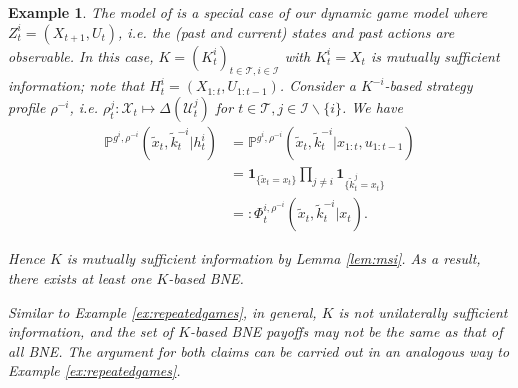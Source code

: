 \documentclass[pdflatex,sn-basic]{sn-jnl}
\renewcommand{\Pr}{\mathbb{P}}
\newcommand{\Comp}{K}
\newcommand{\comp}{k}
\theoremstyle{thmstyleone}%
\theoremstyle{thmstyletwo}%
\theoremstyle{thmstylethree}%
\newtheorem{example}{Example}
\begin{document}
\begin{example}\label{ex:maskintirole}
	The model of \citep{maskin2001markov} is a special case of our dynamic game model where $Z_t^i=(X_{t+1}, U_t)$, i.e. the (past and current) states and past actions are observable. In this case, $\Comp=(\Comp_t^i)_{t\in\mathcal{T}, i\in\mathcal{I}}$ with $\Comp_t^i=X_t$ is mutually sufficient information; note that $H_t^i=(X_{1:t}, U_{1:t-1})$. Consider a $\Comp^{-i}$-based strategy profile $\rho^{-i}$, i.e. $\rho_t^j\colon\mathcal{X}_t\mapsto \Delta(\mathcal{U}_t^j)$ for $t\in\mathcal{T}, j\in\mathcal{I}\backslash\{i\}$. We have
	\begin{align}
		\Pr^{g^i, \rho^{-i}}(\tilde{x}_t, \tilde{\comp}_t^{-i}|h_t^i) &=\Pr^{g^i, \rho^{-i}}(\tilde{x}_t, \tilde{\comp}_t^{-i}|x_{1:t}, u_{1:t-1})\\
		&= \bm{1}_{\{\tilde{x}_t = x_t\} } \prod_{j\neq i} \bm{1}_{\{\tilde{\comp}_t^j = x_t\} }\\
		&=:\Phi_t^{i, \rho^{-i}}(\tilde{x}_t, \tilde{\comp}_t^{-i}|x_t).
	\end{align}
	
	Hence $\Comp$ is mutually sufficient information by Lemma \ref{lem:msi}. As a result, there exists at least one $\Comp$-based BNE.
	
	Similar to Example \ref{ex:repeatedgames}, in general, $\Comp$ is not unilaterally sufficient information, and the set of $\Comp$-based BNE payoffs may not be the same as that of all BNE. The argument for both claims can be carried out in an analogous way to Example \ref{ex:repeatedgames}.
\end{example}
\end{document}
